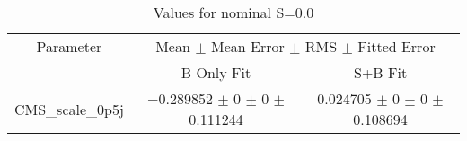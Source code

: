 \begin{table}
\centering
\caption{Values for nominal S=0.0}
\begin{tabular}{ccc}
\toprule
Parameter & \multicolumn{2}{c}{Mean $\pm$ Mean Error $\pm$ RMS $\pm$ Fitted Error}\\
 & B-Only Fit & S+B Fit\\
\midrule
CMS\_scale\_0p5j & \num{-0.289852} $\pm$ \num{0} $\pm$ \num{0} $\pm$ \num{0.111244} & \num{0.024705} $\pm$ \num{0} $\pm$ \num{0} $\pm$ \num{0.108694}\\
\bottomrule
\end{tabular}
\end{table}